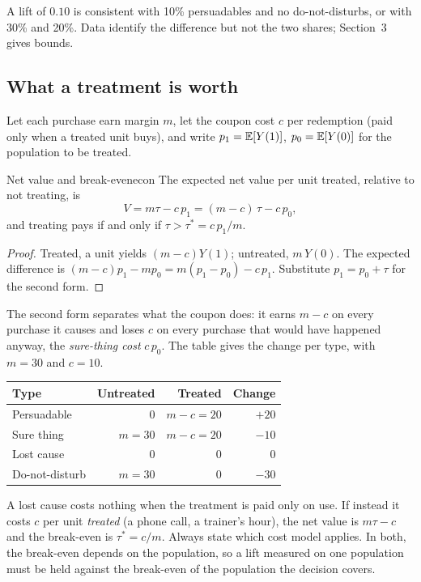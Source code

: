 \documentclass[11pt]{article}
\begin{document}
A lift of $0.10$ is consistent with 10\% persuadables and no do-not-disturbs, or with 30\% and 20\%. Data
identify the difference but not the two shares; Section~3 gives bounds.

\subsection{What a treatment is worth}

Let each purchase earn margin $m$, let the coupon cost $c$ per redemption (paid only when a treated unit
buys), and write $p_1 = \mathbb{E}[Y(1)]$, $p_0 = \mathbb{E}[Y(0)]$ for the population to be treated.

\begin{prop}{Net value and break-even}{econ}
The expected net value per unit treated, relative to not treating, is
\[
  V = m\tau - c\,p_1 = (m-c)\,\tau - c\,p_0,
\]
and treating pays if and only if $\tau > \tau^\ast = c\,p_1/m$.
\end{prop}
\begin{proof}
Treated, a unit yields $(m-c)Y(1)$; untreated, $m\,Y(0)$. The expected difference is
$(m-c)p_1 - m p_0 = m(p_1 - p_0) - c\,p_1$. Substitute $p_1 = p_0 + \tau$ for the second form.
\end{proof}

The second form separates what the coupon does: it earns $m-c$ on every purchase it causes and loses $c$
on every purchase that would have happened anyway, the \emph{sure-thing cost} $c\,p_0$. The table gives the
change per type, with $m = 30$ and $c = 10$.
\begin{center}
\begin{tabular}{lrrr}
\toprule
Type & Untreated & Treated & Change \\
\midrule
Persuadable & 0 & $m-c = 20$ & $+20$ \\
Sure thing & $m = 30$ & $m-c = 20$ & $-10$ \\
Lost cause & 0 & 0 & $0$ \\
Do-not-disturb & $m = 30$ & 0 & $-30$ \\
\bottomrule
\end{tabular}
\end{center}
A lost cause costs nothing when the treatment is paid only on use. If instead it costs $c$ per unit
\emph{treated} (a phone call, a trainer's hour), the net value is $m\tau - c$ and the break-even is
$\tau^\ast = c/m$. Always state which cost model applies. In both, the break-even depends on the
population, so a lift measured on one population must be held against the break-even of the population
the decision covers.
\end{document}
